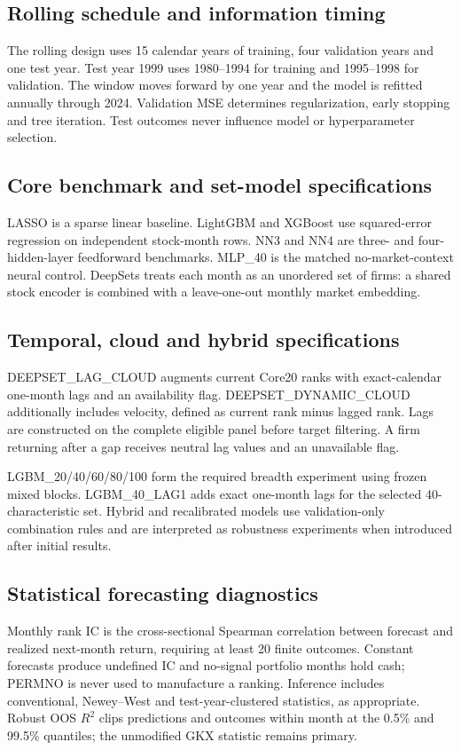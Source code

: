 \documentclass[11pt,a4paper]{article}
\begin{document}
\subsection{Rolling schedule and information timing}
The rolling design uses 15 calendar years of training, four validation years and one test year. Test year 1999 uses 1980--1994 for training and 1995--1998 for validation. The window moves forward by one year and the model is refitted annually through 2024. Validation MSE determines regularization, early stopping and tree iteration. Test outcomes never influence model or hyperparameter selection.

\subsection{Core benchmark and set-model specifications}
LASSO is a sparse linear baseline. LightGBM and XGBoost use squared-error regression on independent stock-month rows. NN3 and NN4 are three- and four-hidden-layer feedforward benchmarks. MLP\_40 is the matched no-market-context neural control. DeepSets treats each month as an unordered set of firms: a shared stock encoder is combined with a leave-one-out monthly market embedding.

\subsection{Temporal, cloud and hybrid specifications}
DEEPSET\_LAG\_CLOUD augments current Core20 ranks with exact-calendar one-month lags and an availability flag. DEEPSET\_DYNAMIC\_CLOUD additionally includes velocity, defined as current rank minus lagged rank. Lags are constructed on the complete eligible panel before target filtering. A firm returning after a gap receives neutral lag values and an unavailable flag.

LGBM\_20/40/60/80/100 form the required breadth experiment using frozen mixed blocks. LGBM\_40\_LAG1 adds exact one-month lags for the selected 40-characteristic set. Hybrid and recalibrated models use validation-only combination rules and are interpreted as robustness experiments when introduced after initial results.

\subsection{Statistical forecasting diagnostics}
Monthly rank IC is the cross-sectional Spearman correlation between forecast and realized next-month return, requiring at least 20 finite outcomes. Constant forecasts produce undefined IC and no-signal portfolio months hold cash; PERMNO is never used to manufacture a ranking. Inference includes conventional, Newey--West and test-year-clustered statistics, as appropriate. Robust OOS $R^2$ clips predictions and outcomes within month at the 0.5\% and 99.5\% quantiles; the unmodified GKX statistic remains primary.
\end{document}
